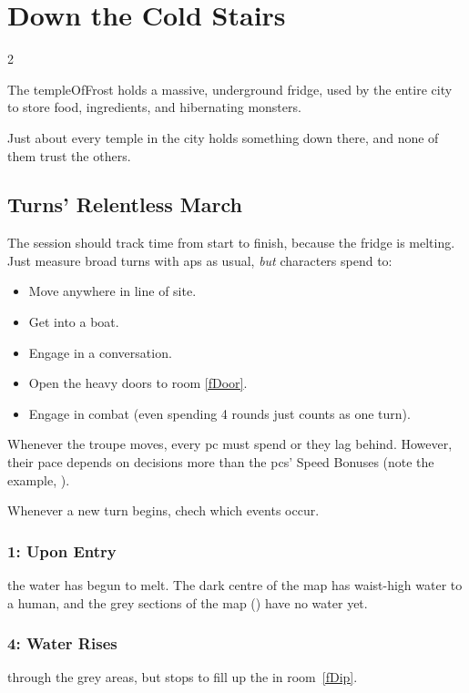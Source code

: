 \section{Down the Cold Stairs}
\label{theFridge}

\pacingExample

\begin{multicols}{2}

\noindent
The \gls{templeOfFrost} holds a massive, underground fridge, used by the entire city to store food, \glspl{ingredient}, and hibernating \glspl{monster}.

Just about every \gls{temple} in the city holds something down there, and none of them trust the others.

\subsection{Turns' Relentless March}

The session should track time from start to finish, because the fridge is melting.
Just measure broad turns with \glspl{ap} as usual, \emph{but} characters spend  to:

\begin{itemize}
  \item
  Move anywhere in line of site.
  \item
  Get into a boat.
  \item
  Engage in a conversation.
  \item
  Open the heavy doors to room \vref{fDoor}.
  \item
  Engage in combat (even spending 4 \glspl{round} just counts as one turn).
\end{itemize}

Whenever the troupe moves, every \gls{pc} must spend  or they lag behind.
However, their pace depends on decisions more than the \glspl{pc}' Speed Bonuses (note the example, ).

Whenever a new turn begins, chech which events occur.

\subsubsection[Upon Entry]{1: Upon Entry}
the water has begun to melt.
The dark centre of the map has waist-high water to a human, and the grey sections of the map () have no water yet.

\subsubsection[Water Rises]{4: Water Rises}
through the grey \glspl{area}, but stops to fill up the  in room~\vref{fDip}.


\end{multicols}
